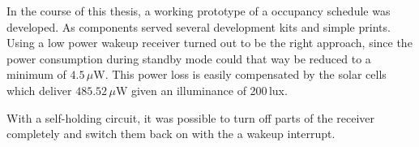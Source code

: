 In the course of this thesis, a working prototype of a occupancy schedule was developed.
As components served several development kits and simple prints.
Using a low power wakeup receiver turned out to be the right approach, since the power consumption during standby mode could that way be reduced to a minimum of $4.5\,\mu\text{W}$.
This power loss is easily compensated by the solar cells which deliver $485.52\,\mu\text{W}$ given an illuminance of 200\,lux.

With a self-holding circuit, it was possible to turn off parts of the receiver completely and switch them back on with the a wakeup interrupt.
